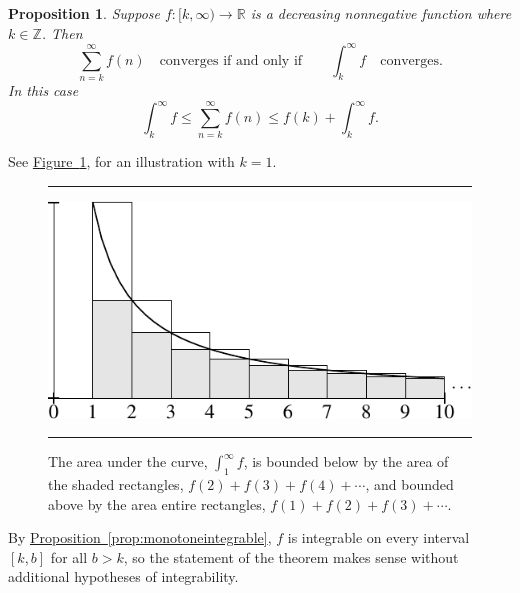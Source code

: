 \documentclass[12pt]{book}
\newenvironment{myfigureht}{%
\begin{figure}[h!t]
\noindent\rule{\textwidth}{0.4pt}\vspace{12pt}\par\centering}%
{\par\noindent\rule{\textwidth}{0.4pt}
\end{figure}}
\newcommand{\R}{{\mathbb{R}}}
\newcommand{\Z}{{\mathbb{Z}}}
\theoremstyle{plain}
\newtheorem{prop}[thm]{Proposition}
\theoremstyle{remark}
\theoremstyle{definition}
\theoremstyle{exercise}
\theoremstyle{example}
\newcommand{\figureref}[1]{\hyperref[#1]{Figure~\ref*{#1}}}
\newcommand{\propref}[1]{\hyperref[#1]{Proposition~\ref*{#1}}}
\begin{document}
\begin{prop}
Suppose $f \colon [k,\infty) \to \R$ is a decreasing nonnegative
function where $k \in \Z$.  Then
\begin{equation*}
\sum_{n=k}^\infty f(n)
\quad \text{converges if and only if}
\qquad
\int_k^\infty f
\quad \text{converges}.
\end{equation*}
In this case 
\begin{equation*}
\int_k^\infty f
\leq
\sum_{n=k}^\infty f(n)
\leq
f(k)+
\int_k^\infty f .
\end{equation*}
\end{prop}
See \figureref{fig:integraltest}, for an illustration with $k=1$.
\begin{myfigureht}
\includegraphics{figures/integraltest}
\caption{The area under the curve, 
$\int_1^\infty f$, is bounded below
by the area of the shaded rectangles,
$f(2)+f(3)+f(4)+\cdots$, and bounded above
by the area entire rectangles,
$f(1)+f(2)+f(3)+\cdots$.\label{fig:integraltest}}
\end{myfigureht}
By \propref{prop:monotoneintegrable},
$f$ is integrable
on every interval $[k,b]$ for all $b > k$, so the statement of the theorem
makes sense without additional hypotheses of integrability.
\end{document}
